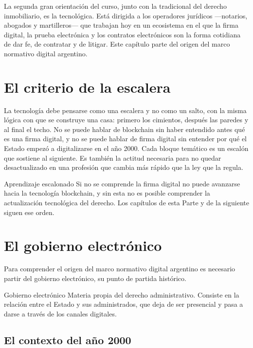 \documentclass[12pt,oneside]{book}
\begin{document}
La segunda gran orientación del curso, junto con la tradicional del derecho inmobiliario, es la tecnológica. Está dirigida a los operadores jurídicos ---notarios, abogados y martilleros--- que trabajan hoy en un ecosistema en el que la firma digital, la prueba electrónica y los contratos electrónicos son la forma cotidiana de dar fe, de contratar y de litigar. Este capítulo parte del origen del marco normativo digital argentino.

\section{El criterio de la escalera}

La tecnología debe pensarse como una escalera y no como un salto, con la misma lógica con que se construye una casa: primero los cimientos, después las paredes y al final el techo. No se puede hablar de blockchain sin haber entendido antes qué es una firma digital, y no se puede hablar de firma digital sin entender por qué el Estado empezó a digitalizarse en el año 2000. Cada bloque temático es un escalón que sostiene al siguiente. Es también la actitud necesaria para no quedar desactualizado en una profesión que cambia más rápido que la ley que la regula.

\begin{concept}{Aprendizaje escalonado}
Si no se comprende la firma digital no puede avanzarse hacia la tecnología blockchain, y sin esta no es posible comprender la actualización tecnológica del derecho. Los capítulos de esta Parte y de la siguiente siguen ese orden.
\end{concept}

\section{El gobierno electrónico}

Para comprender el origen del marco normativo digital argentino es necesario partir del gobierno electrónico, su punto de partida histórico.

\begin{definition}{Gobierno electrónico}
Materia propia del derecho administrativo. Consiste en la relación entre el Estado y sus administrados, que deja de ser presencial y pasa a darse a través de los canales digitales.
\end{definition}

\subsection{El contexto del año 2000}
\end{document}
